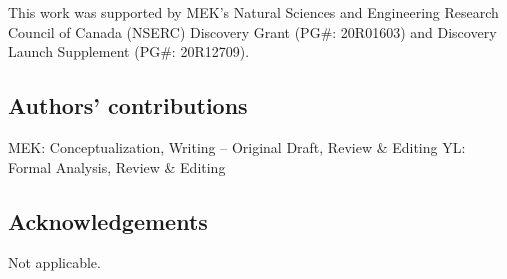 \documentclass[sn-vancouver,Numbered,lineno,pdflatex]{sn-jnl}
\begin{document}
This work was supported by MEK's Natural Sciences and Engineering
Research Council of Canada (NSERC) Discovery Grant (PG\#: 20R01603) and
Discovery Launch Supplement (PG\#: 20R12709).

\subsection*{Authors' contributions}\label{authors-contributions}

MEK: Conceptualization, Writing -- Original Draft, Review \& Editing YL:
Formal Analysis, Review \& Editing

\subsection*{Acknowledgements}\label{acknowledgements}

Not applicable.

\renewcommand\refname{References}

\end{document}
